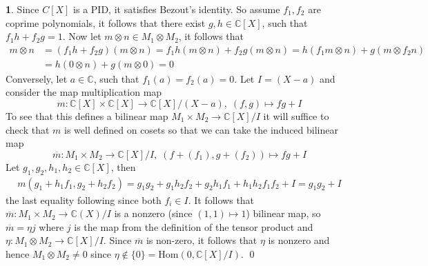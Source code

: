 \documentclass[11pt]{article}
\theoremstyle{definition}
\newtheorem{pb}{}
\newcommand{\set}[1]{\{#1\}}
\begin{document}
    \begin{pb}
        Since \(C[X]\) is a PID, it satisfies Bezout's identity. So assume \(f_1, f_2\) are coprime polynomials, it follows that there exist \(g,h \in \mathbb{C}[X]\), such that \(f_1h + f_2g = 1\). Now let \(m \otimes n \in M_1 \otimes M_2\), it follows that
        \begin{align*}
            m \otimes n &= (f_1h + f_2g)(m \otimes n) = f_1h(m \otimes n) + f_2g(m \otimes n) = h(f_1m \otimes n) + g(m\otimes f_2n) \\
            &= h(0 \otimes n) + g(m \otimes 0) = 0
        \end{align*}
        Conversely, let \(a \in \mathbb{C}\), such that \(f_1(a) = f_2(a) = 0\). Let \(I = (X-a)\) and consider the map multiplication map \[m: \mathbb{C}[X] \times \mathbb{C}[X] \to \mathbb{C}[X]/(X-a),\; (f,g) \mapsto fg + I\]
        To see that this defines a bilinear map \(M_1 \times M_2 \to \mathbb{C}[X]/I\) it will suffice to check that \(m\) is well defined on cosets so that we can take the induced bilinear map \[\overline{m}: M_1 \times M_2 \to \mathbb{C}[X]/I, \;(f+(f_1),g+(f_2)) \mapsto fg + I\] Let \(g_1, g_2, h_1,h_2 \in \mathbb{C}[X]\), then
        \begin{align*}
            m(g_1 + h_1f_1,g_2 + h_2f_2) = g_1g_2 + g_1h_2f_2 + g_2h_1f_1 + h_1h_2f_1f_2 + I = g_1g_2 + I
        \end{align*}
        the last equality following since both \(f_i \in I\). It follows that \(\overline{m}: M_1 \times M_2 \to \mathbb{C}(X)/I\) is a nonzero (since \((1,1) \mapsto 1\)) bilinear map, so \(\overline{m} = \eta j\) where \(j\) is the map from the definition of the tensor product and \(\eta: M_1 \otimes M_2 \to \mathbb{C}[X]/I\). Since \(\overline{m}\) is non-zero, it follows that \(\eta\) is nonzero and hence \(M_1 \otimes M_2 \neq 0\) since \(\eta \not \in \set{0} = \text{Hom}(0,\mathbb{C}[X]/I)\). \qed
    \end{pb}
\end{document}
